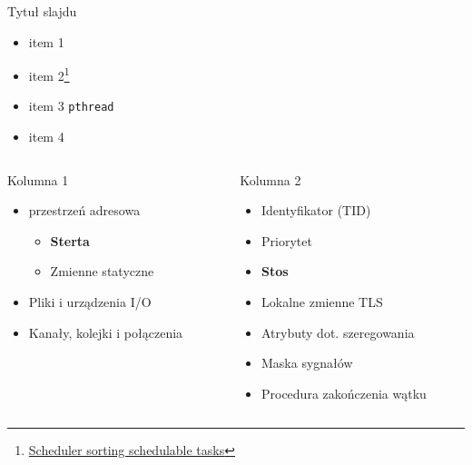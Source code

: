 \documentclass[handout]{beamer}
\begin{document}
\begin{frame}{Tytuł slajdu}


\begin{itemize}
\item item 1
\item item 2\footnote{\href{https://stackoverflow.com/questions/15601155/does-linux-schedule-a-process-or-a-thread}{Scheduler sorting schedulable tasks}}
\item item 3 \lstinline[style=mycpp]{pthread}
\item item 4
\end{itemize}

\begin{columns}
\begin{column}[t]{0.5\textwidth}

\begin{center}
Kolumna 1
\end{center}

\begin{itemize}
\item przestrzeń adresowa
\begin{itemize}
\item \textbf{Sterta}
\item Zmienne statyczne
\end{itemize}
\item Pliki i urządzenia I/O
\item Kanały, kolejki i połączenia
\end{itemize}

\end{column}
\begin{column}[t]{0.5\textwidth}

\begin{center}
Kolumna 2
\end{center}

\begin{itemize}
\item Identyfikator (TID)
\item Priorytet
\item \textbf{Stos}
\item Lokalne zmienne TLS
\item Atrybuty dot. szeregowania
\item Maska sygnałów
\item Procedura zakończenia wątku
\end{itemize}

\end{column}
\end{columns}


\end{frame}
\end{document}
